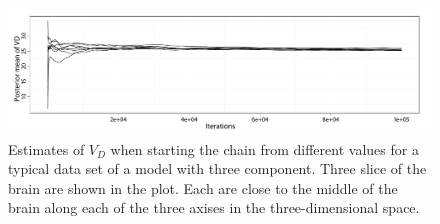 \begin{figure}[t]
  \UseAltLinespread
  \includegraphics[width=\linewidth]{fig_src/PET_VD}
  \caption[Convergence diagnostics for the random walk algorithm for the
  \protect\pet compartmental model using averages]
  {Estimates of $V_D$ when starting the \mcmc chain from different values for a typical data set of a \pet model with three component. Three slice of the brain are shown in the plot. Each are close to the middle of the brain along each of the three axises in the three-dimensional space.}
  \label{fig:pet vd mean}
\end{figure}
